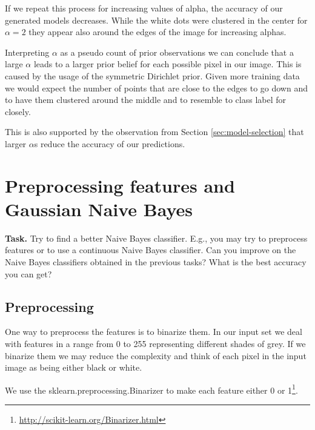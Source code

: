 \documentclass{support/acm_proc_article-sp}
\begin{document}
    If we repeat this process for increasing values of alpha, the accuracy of our generated models decreases.
    While the white dots were clustered in the center for $\alpha = 2$ they appear also around the edges of the image
    for increasing alphas.

    Interpreting $\alpha$ as a pseudo count of prior observations we can conclude that a large $\alpha$ leads to
    a larger prior belief for each possible pixel in our image.
    This is caused by the usage of the symmetric Dirichlet prior.
    Given more training data we would expect the number of points that are close to the edges to go down and to have
    them clustered around the middle and to resemble to class label for closely.

    This is also supported by the observation from Section \ref{sec:model-selection} that larger $\alpha$s reduce the
    accuracy of our predictions.


    \section{Preprocessing features and Gaussian Naive Bayes}

    \textbf{Task.} Try to find a better Naive Bayes classifier.
    E.g., you may try to preprocess features or to use a continuous Naive Bayes classifier.
    Can you improve on the Naive Bayes classifiers obtained in the previous tasks?
    What is the best accuracy you can get?

    \subsection{Preprocessing}

    One way to preprocess the features is to binarize them.
    In our input set we deal with features in a range from 0 to 255 representing different shades of grey.
    If we binarize them we may reduce the complexity and think of each pixel in the input image as being either
    black or white.

    We use the sklearn.preprocessing.Binarizer to make each feature either 0 or
    1\footnote{\href{http://scikit-learn.org/stable/modules/generated/sklearn.preprocessing.Binarizer.html}{http://scikit-learn.org/Binarizer.html}}.
\end{document}
